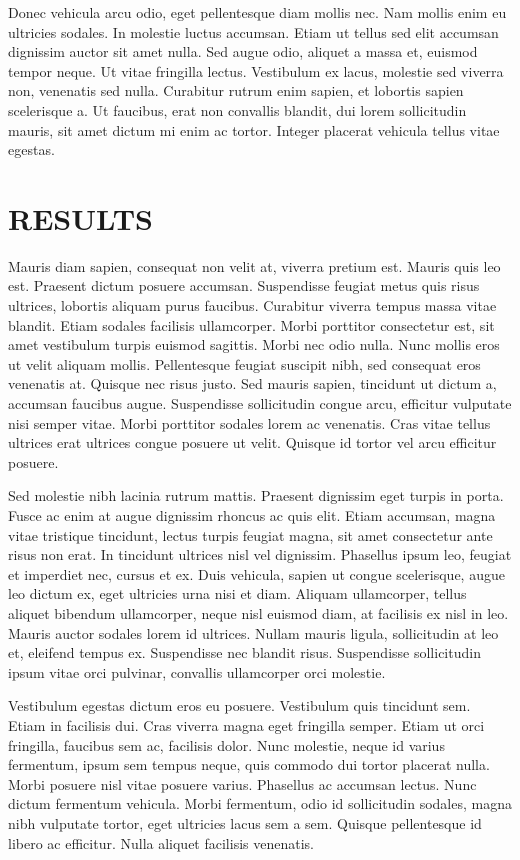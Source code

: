 Donec vehicula arcu odio, eget pellentesque diam mollis nec. Nam mollis enim eu ultricies sodales. In molestie luctus accumsan. Etiam ut tellus sed elit accumsan dignissim auctor sit amet nulla. Sed augue odio, aliquet a massa et, euismod tempor neque. Ut vitae fringilla lectus. Vestibulum ex lacus, molestie sed viverra non, venenatis sed nulla. Curabitur rutrum enim sapien, et lobortis sapien scelerisque a. Ut faucibus, erat non convallis blandit, dui lorem sollicitudin mauris, sit amet dictum mi enim ac tortor. Integer placerat vehicula tellus vitae egestas.


\chapter{RESULTS}
 
Mauris diam sapien, consequat non velit at, viverra pretium est. Mauris quis leo est. Praesent dictum posuere accumsan. Suspendisse feugiat metus quis risus ultrices, lobortis aliquam purus faucibus. Curabitur viverra tempus massa vitae blandit. Etiam sodales facilisis ullamcorper. Morbi porttitor consectetur est, sit amet vestibulum turpis euismod sagittis. Morbi nec odio nulla. Nunc mollis eros ut velit aliquam mollis. Pellentesque feugiat suscipit nibh, sed consequat eros venenatis at. Quisque nec risus justo. Sed mauris sapien, tincidunt ut dictum a, accumsan faucibus augue. Suspendisse sollicitudin congue arcu, efficitur vulputate nisi semper vitae. Morbi porttitor sodales lorem ac venenatis. Cras vitae tellus ultrices erat ultrices congue posuere ut velit. Quisque id tortor vel arcu efficitur posuere.

Sed molestie nibh lacinia rutrum mattis. Praesent dignissim eget turpis in porta. Fusce ac enim at augue dignissim rhoncus ac quis elit. Etiam accumsan, magna vitae tristique tincidunt, lectus turpis feugiat magna, sit amet consectetur ante risus non erat. In tincidunt ultrices nisl vel dignissim. Phasellus ipsum leo, feugiat et imperdiet nec, cursus et ex. Duis vehicula, sapien ut congue scelerisque, augue leo dictum ex, eget ultricies urna nisi et diam. Aliquam ullamcorper, tellus aliquet bibendum ullamcorper, neque nisl euismod diam, at facilisis ex nisl in leo. Mauris auctor sodales lorem id ultrices. Nullam mauris ligula, sollicitudin at leo et, eleifend tempus ex. Suspendisse nec blandit risus. Suspendisse sollicitudin ipsum vitae orci pulvinar, convallis ullamcorper orci molestie.

Vestibulum egestas dictum eros eu posuere. Vestibulum quis tincidunt sem. Etiam in facilisis dui. Cras viverra magna eget fringilla semper. Etiam ut orci fringilla, faucibus sem ac, facilisis dolor. Nunc molestie, neque id varius fermentum, ipsum sem tempus neque, quis commodo dui tortor placerat nulla. Morbi posuere nisl vitae posuere varius. Phasellus ac accumsan lectus. Nunc dictum fermentum vehicula. Morbi fermentum, odio id sollicitudin sodales, magna nibh vulputate tortor, eget ultricies lacus sem a sem. Quisque pellentesque id libero ac efficitur. Nulla aliquet facilisis venenatis.

